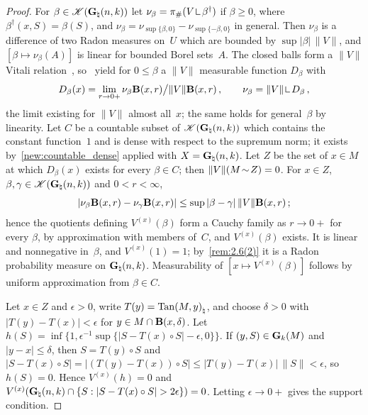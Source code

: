 \begin{proof}
    For $\beta \in \mathscr{K}(\mathbf{G}_{\natural}(n,k))$ let $\nu_\beta = \pi_\# (V \restrict
    \beta^\dagger)$ if $\beta \ge 0$, where $\beta^\dagger(x,S) = \beta(S)$, and $\nu_\beta =
    \nu_{\sup\{\beta,0\}} - \nu_{\sup\{-\beta,0\}}$ in general. Then $\nu_\beta$ is a difference
    of two Radon measures on~$U$ which are bounded by $\sup |\beta| \, \|V\|$, and $[ \beta \mapsto
    \nu_\beta(A) ]$ is linear for bounded Borel sets~$A$. The closed balls form a $\|V\|$ Vitali
    relation~\cite[2.8.18]{Federer1969}, so~\cite[2.9.2, 2.9.5, 2.9.6, 2.9.7]{Federer1969} yield
    for $0 \le \beta$ a $\|V\|$ measurable function $D_\beta$ with
    \begin{displaymath}
        D_\beta(x) = \lim_{r \to 0+} \nu_\beta \cball{x}{r} \big/ \|V\| \cball{x}{r} \,, \qquad
        \nu_\beta = \|V\| \restrict D_\beta \,,
    \end{displaymath}
    the limit existing for $\|V\|$ almost all~$x$; the same holds for general~$\beta$ by
    linearity. Let $C$ be a countable subset of $\mathscr{K}(\mathbf{G}_{\natural}(n,k))$ which contains
    the constant function~$1$ and is dense with respect to the supremum norm; it exists
    by~\ref{new:countable_dense} applied with $X = \mathbf{G}_{\natural}(n,k)$. Let $Z$ be the set of
    $x \in M$ at which $D_\beta(x)$ exists for every $\beta \in C$; then $\|V\|(M \!\sim\! Z) =
    0$. For $x \in Z$, $\beta, \gamma \in \mathscr{K}(\mathbf{G}_{\natural}(n,k))$ and $0 < r < \infty$,
    \begin{displaymath}
        |\nu_\beta \mathbf{B}(x,r) - \nu_\gamma \mathbf{B}(x,r)| \le \sup |\beta - \gamma| \,
        \|V\| \mathbf{B}(x,r) \,;
    \end{displaymath}
    hence the quotients defining $V^{(x)}(\beta)$ form a Cauchy family as $r \to 0+$ for every
    $\beta$, by approximation with members of~$C$, and $V^{(x)}(\beta)$ exists. It is linear and
    nonnegative in~$\beta$, and $V^{(x)}(1) = 1$; by~\ref{rem:2.6(2)} it is a Radon probability
    measure on $\mathbf{G}_{\natural}(n,k)$. Measurability of $[x \mapsto V^{(x)}(\beta)]$ follows by
    uniform approximation from $\beta \in C$.

    Let $x \in Z$ and $\epsilon > 0$, write $T(y) = {\operatorname{Tan}(M,y)}_\natural$, and choose $\delta >
    0$ with $|T(y) - T(x)| < \epsilon$ for $y \in M \cap \mathbf{B}(x,\delta)$. Let
    $h(S) = \inf \{ 1, \epsilon^{-1} \sup \{ |S - T(x) \circ S| - \epsilon, 0 \} \}$. If $(y,S)
    \in \mathbf{G}_{k}(M)$ and $|y - x| \le \delta$, then $S = T(y) \circ S$ and $|S - T(x) \circ S| = |(T(y)
    - T(x)) \circ S| \le |T(y) - T(x)| \, \|S\| < \epsilon$, so $h(S) = 0$.
    Hence $V^{(x)}(h) = 0$ and $V^{(x)}(\mathbf{G}_{\natural}(n,k) \cap \{ S : |S - T(x) \circ S| > 2
    \epsilon \}) = 0$. Letting $\epsilon \to 0+$ gives the support condition.


\end{proof}
